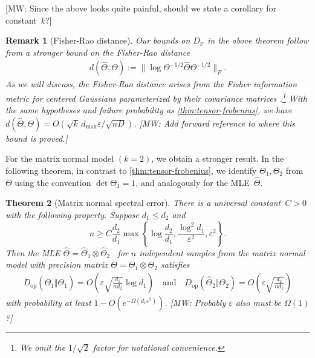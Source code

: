 \documentclass[aos]{imsart}
\newtheorem{theorem}{Theorem}[section]
\newtheorem{remark*}[theorem]{Remark}
\theoremstyle{definition}
\numberwithin{equation}{section}
\DeclareMathOperator{\PD}{PD}
\newcommand{\htheta}{\widehat{\Theta}}
\newcommand{\ot}{\otimes}
\newcommand{\eps}{\varepsilon}
\newcommand{\DF}{D_{\operatorname{F}}}
\newcommand{\Dop}{D_{\operatorname{op}}}
\def\dmax{d_{\max}}
\newcommand{\MW}[1]{{\color{red}[MW: #1]}}
\newcommand{\MW}[1]{{}}
\begin{document}
\MW{Since the above looks quite painful, should we state a corollary for constant~$k$?}

\begin{remark*}[Fisher-Rao distance]
Our bounds on $\DF$ in the above theorem follow from a stronger bound on the \emph{Fisher-Rao distance}
\begin{align}\label{eq:fisher rao}
  d(\htheta, \Theta):= \| \log \Theta^{-1/2} \htheta \Theta^{-1/2}\|_F.
\end{align}
As we will discuss, the Fisher-Rao distance arises from the Fisher information metric for centered Gaussians parameterized by their covariance matrices \citep{skovgaard1984riemannian}.\footnote{We omit the $1/\sqrt{2}$ factor for notational convenience.}
With the same hypotheses and failure probability as \cref{thm:tensor-frobenius}, we have $d(\htheta, \Theta)  = O(\sqrt{k} \, \dmax \eps/\sqrt{nD})$.
\MW{Add forward reference to where this bound is proved.}
\end{remark*}

For the matrix normal model $(k=2)$, we obtain a stronger result.
In the following theorem, in contrast to \cref{thm:tensor-frobenius}, we identify $\Theta_1, \Theta_2$ from $\Theta$ using the convention $\det \Theta_1 = 1$, and analogously for the MLE~$\htheta$.

\newcommand{\MatrixSpec}{%
There is a universal constant~$C>0$ with the following property.
Suppose $d_1 \leq d_2$ and
\[ n \geq C \frac{d_2}{d_1} \max \left\{\log \frac{d_2}{d_1},  \frac{\log^2 d_1}{\eps^2}, \eps^2\right\}. \]
Then the MLE $\htheta = \htheta_1 \ot \htheta_2$ \ for $n$ independent samples from the matrix normal model with precision matrix $\Theta = \Theta_1 \ot \Theta_2$ satisfies
\begin{align*}
  \Dop(\widehat{\Theta}_1 \Vert \Theta_1) = O\left(\eps \sqrt{\frac{d_1}{nd_2}} \log d_1\right)
\quad\text{and}\quad
\Dop(\widehat{\Theta}_2 \Vert \Theta_2) = O\left(\eps \sqrt{\frac{d_2}{nd_1}}\right)
\end{align*}
with probability at least  $1 - O(e^{ - \Omega( d_1 \eps^2)})$.
\MW{Probably $\eps$ also must be $\Omega(1)$?}}


\begin{theorem}[Matrix normal spectral error]\label{thm:matrix-normal}
\MatrixSpec
\end{theorem}
\end{document}

